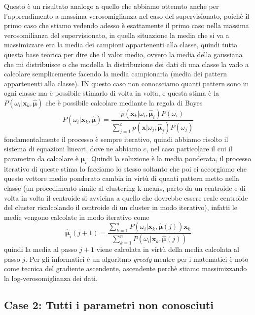 \noindent Questo è un risultato analogo a quello che abbiamo ottenuto anche per l'apprendimento a massima verosomiglianza nel caso del supervisionato, poichè il primo caso che stiamo vedendo adesso è esattamente il primo caso nella massima verosomilianza del supervisionato, in quella situazione la media che si va a massimizzare era la media dei campioni appartenenti alla classe, quindi tutta questa base teorica per dire che il valor medio, ovvero la media della gaussiana che mi distribuisce o che modella la distribuzione dei dati di una classe la vado a calcolare semplicemente facendo la media campionaria (media dei pattern appartenenti alla classe). IN questo caso non conocsciamo quanti pattern sono in ogni classe ma è possibile stimarlo di volta in volta, e questa stima è la $P(\omega_i|\mathbf{x}_k, \hat{\mathbf{\mu}})$ che è possibile calcolare mediante la regola di Bayes 
\begin{equation}
P(\omega_i|\mathbf{x}_k, \hat{\mathbf{\mu}}) = \frac{ p(\mathbf{x}_k|\omega_i, \hat{\mathbf{\mu}}_i) P(\omega_i) }{ \sum_{j=1}^c p(\mathbf{x}|\omega_j, \hat{\mathbf{\mu}}_j) P(\omega_j)}
\end{equation}
fondamentalmente il processo è sempre iterativo, quindi abbiamo risolto il sistema di equazioni lineari, dove ne abbiamo $c$, nel caso particolare il cui il parametro da calcolare è $\mathbf{\mu}_i$. Quindi la soluzione è la media ponderata, il processo iterativo di queste stima lo facciamo lo stesso soltanto che poi ci accorgiamo che questo vettore medio ponderato cambia in virtù di quanti pattern metto nella classe (un procedimento simile al clustering k-means, parto da un centroide e di volta in volta il centroide si avvicina a quello che dovrebbe essere reale centroide del cluster ricalcolando il centroide di un cluster in modo iterativo), infatti le medie vengono calcolate in modo iterativo come 
\begin{equation}
\mathbf{\hat{\mathbf{\mu}}}_i(j+1) = \frac{\sum_{k=1}^n P(\omega_i|\mathbf{x}_k, \hat{\mathbf{\mu}}(j))  \mathbf{x}_k}{ \sum_{k=1}^n P(\omega_i|\mathbf{x}_k, \hat{\mathbf{\mu}}(j))}
\end{equation}
quindi la media al passo $j+1$ viene calcolata in virtù della media calcolata al passo $j$. Per gli informatici è un algoritmo \emph{greedy} mentre per i matematici è noto come tecnica del gradiente ascendente, ascendente perchè stiamo massimizzando la log-verosomiglianza dei dati.

\subsection{Case 2: Tutti i parametri non conosciuti}

